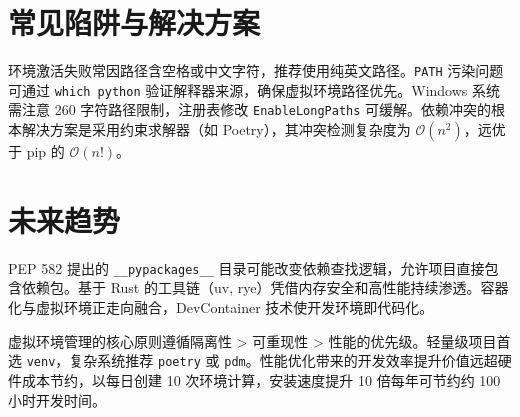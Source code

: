 \chapter{常见陷阱与解决方案}
环境激活失败常因路径含空格或中文字符，推荐使用纯英文路径。\texttt{PATH} 污染问题可通过 \texttt{which python} 验证解释器来源，确保虚拟环境路径优先。Windows 系统需注意 260 字符路径限制，注册表修改 \texttt{EnableLongPaths} 可缓解。依赖冲突的根本解决方案是采用约束求解器（如 Poetry），其冲突检测复杂度为 $\mathcal{O}(n^2)$，远优于 pip 的 $\mathcal{O}(n!)$。\par
\chapter{未来趋势}
PEP 582 提出的 \texttt{\_{}\_{}pypackages\_{}\_{}} 目录可能改变依赖查找逻辑，允许项目直接包含依赖包。基于 Rust 的工具链（uv, rye）凭借内存安全和高性能持续渗透。容器化与虚拟环境正走向融合，DevContainer 技术使开发环境即代码化。\par
虚拟环境管理的核心原则遵循隔离性 > 可重现性 > 性能的优先级。轻量级项目首选 \texttt{venv}，复杂系统推荐 \texttt{poetry} 或 \texttt{pdm}。性能优化带来的开发效率提升价值远超硬件成本节约，以每日创建 10 次环境计算，安装速度提升 10 倍每年可节约约 100 小时开发时间。\par

